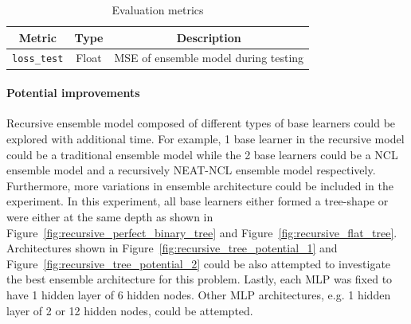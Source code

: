 \documentclass{article}
\begin{document}
\begin{table}[H]
    \centering
    \begin{tabular}{|c|c|c|}
        \hline
        Metric & Type & Description \\
        \hline
        \small\texttt{loss\_test} & Float & MSE of ensemble model during testing \\
        \hline
    \end{tabular}
    \caption{Evaluation metrics}
    \label{table:experiment_6_metric}
\end{table}

\paragraph{Potential improvements}
Recursive ensemble model composed of different types of base learners could be explored with additional time. For example, 1 base learner in the recursive model could  be a traditional ensemble model while the 2 base learners could be a NCL ensemble model and a recursively NEAT-NCL ensemble model respectively. 
Furthermore, more variations in ensemble architecture could be included in the experiment. In this experiment, all base learners either formed a tree-shape or were either at the same depth as shown in Figure~\ref{fig:recursive_perfect_binary_tree} and Figure~\ref{fig:recursive_flat_tree}. Architectures shown in Figure~\ref{fig:recursive_tree_potential_1} and Figure~\ref{fig:recursive_tree_potential_2} could be also attempted to investigate the best ensemble architecture for this problem. 
Lastly, each MLP was fixed to have 1 hidden layer of 6 hidden nodes. Other MLP architectures, e.g. 1 hidden layer of 2 or 12 hidden nodes, could be attempted. 
\end{document}
